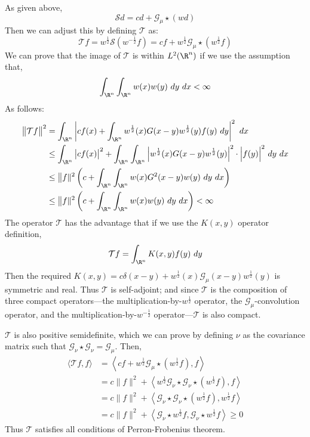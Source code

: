 \documentclass{article}
\begin{document}
As given above,
$$\mathcal Sd=cd+\mathcal G_\mu\star(wd)$$
Then we can adjust this by defining $\mathcal T$ as:
$$\mathcal Tf=w^\frac12\mathcal S\left(w^{-\frac12}f\right)=cf+w^\frac12\mathcal G_\mu\star\left(w^\frac12f\right)$$
We can prove that the image of $\mathcal T$ is within $L^2(\R^n)$ if we use the assumption that,
$$\int_{\R^n}\int_{\R^n}w(x)w(y)\ dy\ dx<\infty$$
As follows:
\begin{align*}
    \big\|\mathcal Tf\big\|^2&=\int_{\R^n}\left|cf(x)+\int_{\R^n}w^\frac12(x)G(x-y)w^\frac12(y)f(y)\ dy\right|^2\ dx \\
    &\le\int_{\R^n}\big|cf(x)\big|^2+\int_{\R^n}\int_{\R^n}\Big|w^\frac12(x)G(x-y)w^\frac12(y)\Big|^2\cdot\Big|f(y)\Big|^2\ dy\ dx \\
    &\le\big\|f\|^2\left(c+\int_{\R^n}\int_{\R^n}w(x)G^2(x-y)w(y)\ dy\ dx\right) \\
    &\le\big\|f\|^2\left(c+\int_{\R^n}\int_{\R^n}w(x)w(y)\ dy\ dx\right) <\infty
\end{align*}
The operator $\mathcal T$ has the advantage that if we use the $K(x,y)$ operator definition,
$$\mathcal Tf=\int_{\R^n}K(x,y)f(y)\ dy$$
Then the required $K(x,y)=c\delta(x-y)+w^\frac12(x)\mathcal G_\mu(x-y)w^\frac12(y)$ is symmetric and real. Thus $\mathcal T$ is self-adjoint; and since $\mathcal T$ is the composition of three compact operators—the multiplication-by-$w^\frac12$ operator, the $\mathcal G_\mu$-convolution operator, and the multiplication-by-$w^{-\frac12}$ operator—$\mathcal T$ is also compact.

$\mathcal T$ is also positive semidefinite, which we can prove by defining $\nu$ as the covariance matrix such that $\mathcal G_\nu\star\mathcal G_\nu=\mathcal G_\mu$. Then,
\begin{align*}
    \big\langle\mathcal Tf,f\big\rangle&=\left\langle cf+w^{\frac12}\mathcal G_\mu\star(w^{\frac12}f),f\right\rangle\\
    &=c\big\|f\big\|^2+\left\langle w^{\frac12}\mathcal G_\nu\star\mathcal G_\nu\star(w^{\frac12}f),f\right\rangle \\
    &=c\big\|f\big\|^2+\left\langle\mathcal G_\nu\star\mathcal G_\nu\star(w^{\frac12}f),w^{\frac12}f\right\rangle \\
    &=c\big\|f\big\|^2+\left\langle\mathcal G_\nu\star w^{\frac12}f,\mathcal G_\nu\star w^{\frac12}f\right\rangle\ge0
\end{align*}
Thus $\mathcal T$ satisfies all conditions of Perron-Frobenius theorem. 
\end{document}

